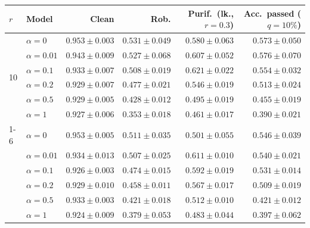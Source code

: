 \begin{tabular}{@{}llrrrr@{}}
\toprule
$r$ & Model & Clean & Rob. & Purif.\ (lk., $r{=}0.3$) & Acc.\ passed ($q{=}10\%$) \\
\midrule
\multirow{6}{*}{10} & $\alpha{=}0$ & $\mathbf{0.953 \pm 0.003}$ & $\mathbf{0.531 \pm 0.049}$ & $0.580 \pm 0.063$ & $0.573 \pm 0.050$ \\
 & $\alpha{=}0.01$ & $0.943 \pm 0.009$ & $0.527 \pm 0.068$ & $0.607 \pm 0.052$ & $\mathbf{0.576 \pm 0.070}$ \\
 & $\alpha{=}0.1$ & $0.933 \pm 0.007$ & $0.508 \pm 0.019$ & $\mathbf{0.621 \pm 0.022}$ & $0.554 \pm 0.032$ \\
 & $\alpha{=}0.2$ & $0.929 \pm 0.007$ & $0.477 \pm 0.021$ & $0.546 \pm 0.019$ & $0.513 \pm 0.024$ \\
 & $\alpha{=}0.5$ & $0.929 \pm 0.005$ & $0.428 \pm 0.012$ & $0.495 \pm 0.019$ & $0.455 \pm 0.019$ \\
 & $\alpha{=}1$ & $0.927 \pm 0.006$ & $0.353 \pm 0.018$ & $0.461 \pm 0.017$ & $0.390 \pm 0.021$ \\
\cmidrule(lr){1-6}
\multirow{6}{*}{20} & $\alpha{=}0$ & $0.953 \pm 0.005$ & $0.511 \pm 0.035$ & $0.501 \pm 0.055$ & $0.546 \pm 0.039$ \\
 & $\alpha{=}0.01$ & $0.934 \pm 0.013$ & $0.507 \pm 0.025$ & $0.611 \pm 0.010$ & $0.540 \pm 0.021$ \\
 & $\alpha{=}0.1$ & $0.926 \pm 0.003$ & $0.474 \pm 0.015$ & $0.592 \pm 0.019$ & $0.531 \pm 0.014$ \\
 & $\alpha{=}0.2$ & $0.929 \pm 0.010$ & $0.458 \pm 0.011$ & $0.567 \pm 0.017$ & $0.509 \pm 0.019$ \\
 & $\alpha{=}0.5$ & $0.933 \pm 0.003$ & $0.421 \pm 0.018$ & $0.512 \pm 0.010$ & $0.421 \pm 0.012$ \\
 & $\alpha{=}1$ & $0.924 \pm 0.009$ & $0.379 \pm 0.053$ & $0.483 \pm 0.044$ & $0.397 \pm 0.062$ \\
\bottomrule
\end{tabular}
